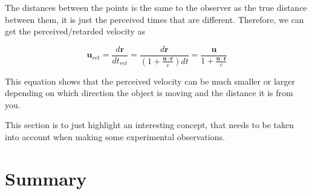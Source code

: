 The distances between the points is the same to the observer as the true distance between them, it is just the perceived times that are different.
Therefore, we can get the perceived/retarded velocity as

\begin{equation}
	\mathbf{u}_{ret} = \frac{d\mathbf{r}}{dt_{ret}} = \frac{d\mathbf{r}}{ \left( 1 + \frac{ \mathbf{u} \cdot \mathbf{r} }{ c} \right) dt } = \frac{\mathbf{u}}{ 1 + \frac{ \mathbf{u} \cdot \mathbf{r} }{ c} }
\end{equation}

This equation shows that the perceived velocity can be much smaller or larger depending on which direction the object is moving and the distance it is from you.

This section is to just highlight an interesting concept, that needs to be taken into account when making some experimental observations.





\section{Summary}

